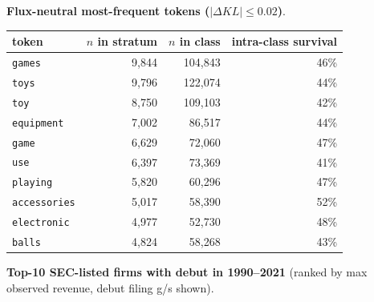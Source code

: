 \textbf{Flux-neutral most-frequent tokens ($|\Delta KL|\leq 0.02$)}.

\begin{tabular}{lrrr}
\toprule
token & $n$ in stratum & $n$ in class & intra-class survival \\
\midrule
\texttt{games} & 9,844 & 104,843 & 46\% \\
\texttt{toys} & 9,796 & 122,074 & 44\% \\
\texttt{toy} & 8,750 & 109,103 & 42\% \\
\texttt{equipment} & 7,002 & 86,517 & 44\% \\
\texttt{game} & 6,629 & 72,060 & 47\% \\
\texttt{use} & 6,397 & 73,369 & 41\% \\
\texttt{playing} & 5,820 & 60,296 & 47\% \\
\texttt{accessories} & 5,017 & 58,390 & 52\% \\
\texttt{electronic} & 4,977 & 52,730 & 48\% \\
\texttt{balls} & 4,824 & 58,268 & 43\% \\
\bottomrule
\end{tabular}

\textbf{Top-10 SEC-listed firms with debut in 1990--2021} (ranked by max observed revenue, debut filing g/s shown).

